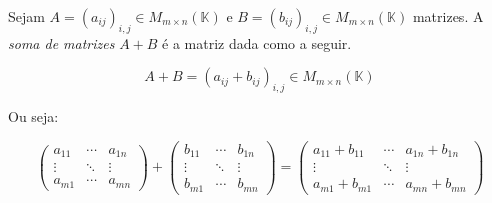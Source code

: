 \begin{definition}
    Sejam $A=(a_{ij})_{i, j}\in M_{m \times n}(\mathbb K)$ e $B=(b_{ij})_{i, j}\in M_{m \times n}(\mathbb K)$ matrizes.
    A \emph{soma de matrizes} $A+B$ é a matriz dada como a seguir.

    \begin{equation*}
        A+B = (a_{ij}+b_{ij})_{i, j}\in M_{m \times n}(\mathbb K)
    \end{equation*}

    Ou seja:
    
    \begin{equation*}
    \begin{pmatrix}
        a_{11}& \cdots & a_{1n} \\
        \vdots & \ddots & \vdots \\
        a_{m1} & \cdots & a_{mn}
    \end{pmatrix}
    +
    \begin{pmatrix}
        b_{11}& \cdots & b_{1n} \\
        \vdots & \ddots & \vdots \\
        b_{m1} & \cdots & b_{mn}
    \end{pmatrix}
    =
    \begin{pmatrix}
        a_{11}+b_{11}& \cdots & a_{1n}+b_{1n} \\
        \vdots & \ddots & \vdots \\
        a_{m1}+b_{m1} & \cdots & a_{mn}+b_{mn}
    \end{pmatrix}
    \end{equation*}
\end{definition}